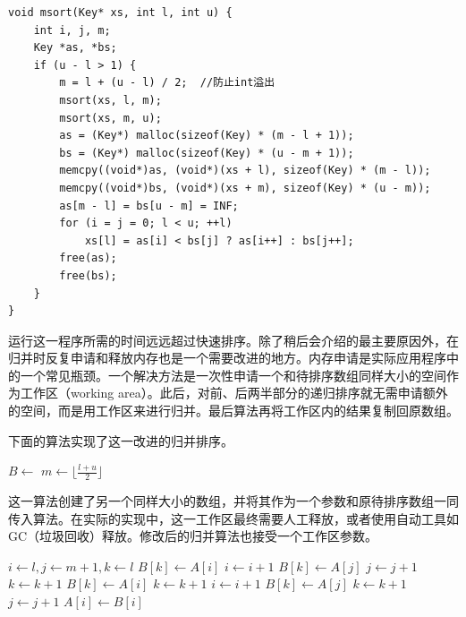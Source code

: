\documentclass[b5paper]{ctexart}
\begin{document}
\lstset{language=C}
\begin{lstlisting}
void msort(Key* xs, int l, int u) {
    int i, j, m;
    Key *as, *bs;
    if (u - l > 1) {
        m = l + (u - l) / 2;  //防止int溢出
        msort(xs, l, m);
        msort(xs, m, u);
        as = (Key*) malloc(sizeof(Key) * (m - l + 1));
        bs = (Key*) malloc(sizeof(Key) * (u - m + 1));
        memcpy((void*)as, (void*)(xs + l), sizeof(Key) * (m - l));
        memcpy((void*)bs, (void*)(xs + m), sizeof(Key) * (u - m));
        as[m - l] = bs[u - m] = INF;
        for (i = j = 0; l < u; ++l)
            xs[l] = as[i] < bs[j] ? as[i++] : bs[j++];
        free(as);
        free(bs);
    }
}
\end{lstlisting}

运行这一程序所需的时间远远超过快速排序。除了稍后会介绍的最主要原因外，在归并时反复申请和释放内存也是一个需要改进的地方。内存申请是实际应用程序中的一个常见瓶颈\cite{Bentley}。一个解决方法是一次性申请一个和待排序数组同样大小的空间作为工作区（working area）。此后，对前、后两半部分的递归排序就无需申请额外的空间，而是用工作区来进行归并。最后算法再将工作区内的结果复制回原数组。

下面的算法实现了这一改进的归并排序。

\begin{algorithmic}[1]
  \State $B \gets $ 
  \State {}
\EndProcedure
\Statex
{}
    \State $m \gets \lfloor \frac{l + u}{2} \rfloor$
    \State {}
    \State {}
    \State {}
  \EndIf
\EndProcedure
\end{algorithmic}

这一算法创建了另一个同样大小的数组，并将其作为一个参数和原待排序数组一同传入算法。在实际的实现中，这一工作区最终需要人工释放，或者使用自动工具如GC（垃圾回收）释放。修改后的归并算法也接受一个工作区参数。

\begin{algorithmic}[1]
  \State $i \gets l, j \gets m + 1, k \gets l$
      \State $B[k] \gets A[i]$
      \State $i \gets i + 1$
    \Else
      \State $B[k] \gets A[j]$
      \State $j \gets j + 1$
    \EndIf
    \State $k \gets k + 1$
  \EndWhile
    \State $B[k] \gets A[i]$
    \State $k \gets k + 1$
    \State $i \gets i + 1$
  \EndWhile
    \State $B[k] \gets A[j]$
    \State $k \gets k + 1$
    \State $j \gets j + 1$
  \EndWhile
   
    \State $A[i] \gets B[i]$
  \EndFor
\EndProcedure
\end{algorithmic}
\end{document}
